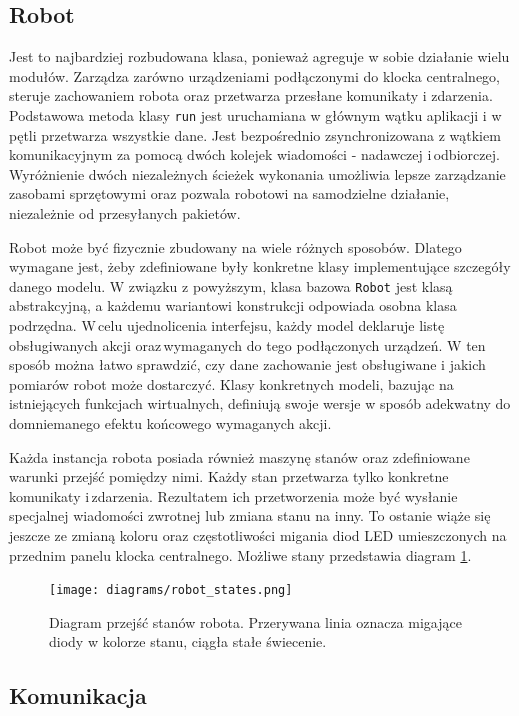 \subsection{Robot}

\indent \indent Jest to najbardziej rozbudowana klasa, ponieważ agreguje w sobie działanie wielu modułów. Zarządza zarówno urządzeniami podłączonymi do klocka centralnego, steruje zachowaniem robota oraz przetwarza przesłane komunikaty i zdarzenia. Podstawowa metoda klasy {\tt run} jest uruchamiana w głównym wątku aplikacji i w pętli przetwarza wszystkie dane. Jest bezpośrednio zsynchronizowana z wątkiem komunikacyjnym za pomocą dwóch kolejek wiadomości - nadawczej i\,odbiorczej. Wyróżnienie dwóch niezależnych ścieżek wykonania umożliwia lepsze zarządzanie zasobami sprzętowymi oraz pozwala robotowi na samodzielne działanie, niezależnie od przesyłanych pakietów.

Robot może być fizycznie zbudowany na wiele różnych sposobów. Dlatego wymagane jest, żeby zdefiniowane były konkretne klasy implementujące szczegóły danego modelu. W związku z powyższym, klasa bazowa {\tt Robot} jest klasą abstrakcyjną, a każdemu wariantowi konstrukcji odpowiada osobna klasa podrzędna. W\,celu ujednolicenia interfejsu, każdy model deklaruje listę obsługiwanych akcji oraz\,wymaganych do tego podłączonych urządzeń. W ten sposób można łatwo sprawdzić, czy dane zachowanie jest obsługiwane i jakich pomiarów robot może dostarczyć. Klasy konkretnych modeli, bazując na istniejących funkcjach wirtualnych, definiują swoje wersje w sposób adekwatny do domniemanego efektu końcowego wymaganych akcji.

Każda instancja robota posiada również maszynę stanów oraz zdefiniowane warunki przejść pomiędzy nimi. Każdy stan przetwarza tylko konkretne komunikaty i\,zdarzenia. Rezultatem ich przetworzenia może być wysłanie specjalnej wiadomości zwrotnej lub zmiana stanu na inny. To ostanie wiąże się jeszcze ze zmianą koloru oraz częstotliwości migania diod LED umieszczonych na przednim panelu klocka centralnego. Możliwe stany przedstawia diagram \ref{fig:robot_states}.

\begin{figure}[!ht]
    \centering
        \texttt{[image: diagrams/robot\_states.png]}
    \caption{Diagram przejść stanów robota. Przerywana linia oznacza migające diody w kolorze stanu, ciągła stałe świecenie.\label{fig:robot_states}}
\end{figure}

\subsection{Komunikacja}

